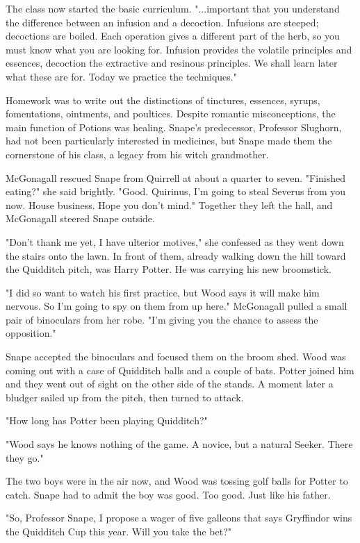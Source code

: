 \documentclass[a4paper,11pt]{article}
\begin{document}
The class now started the basic curriculum. "...important that you understand the difference between an infusion and a decoction. Infusions are steeped; decoctions are boiled. Each operation gives a different part of the herb, so you must know what you are looking for. Infusion provides the volatile principles and essences, decoction the extractive and resinous principles. We shall learn later what these are for. Today we practice the techniques."

Homework was to write out the distinctions of tinctures, essences, syrups, fomentations, ointments, and poultices. Despite romantic misconceptions, the main function of Potions was healing. Snape's predecessor, Professor Slughorn, had not been particularly interested in medicines, but Snape made them the cornerstone of his class, a legacy from his witch grandmother.

McGonagall rescued Snape from Quirrell at about a quarter to seven. "Finished eating?" she said brightly. "Good. Quirinus, I'm going to steal Severus from you now. House business. Hope you don't mind." Together they left the hall, and McGonagall steered Snape outside.

"Don't thank me yet, I have ulterior motives," she confessed as they went down the stairs onto the lawn. In front of them, already walking down the hill toward the Quidditch pitch, was Harry Potter. He was carrying his new broomstick.

"I did so want to watch his first practice, but Wood says it will make him nervous. So I'm going to spy on them from up here." McGonagall pulled a small pair of binoculars from her robe. "I'm giving you the chance to assess the opposition."

Snape accepted the binoculars and focused them on the broom shed. Wood was coming out with a case of Quidditch balls and a couple of bats. Potter joined him and they went out of sight on the other side of the stands. A moment later a bludger sailed up from the pitch, then turned to attack.

"How long has Potter been playing Quidditch?"

"Wood says he knows nothing of the game. A novice, but a natural Seeker. There they go."

The two boys were in the air now, and Wood was tossing golf balls for Potter to catch. Snape had to admit the boy was good. Too good. Just like his father.

"So, Professor Snape, I propose a wager of five galleons that says Gryffindor wins the Quidditch Cup this year. Will you take the bet?"
\end{document}
